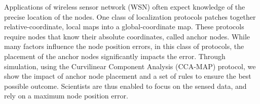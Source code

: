 Applications of wireless sensor network (WSN) often expect knowledge of the precise location of the nodes. One class of localization protocols patches together relative-coordinate, local maps into a global-coordinate map.  These protocols require nodes that know their absolute coordinates, called anchor nodes.  While many factors influence the node position errors, in this class of protocols, the placement of the anchor nodes significantly impacts the error.  Through simulation, using the Curvilinear Component Analysis (CCA-MAP) protocol, we show the impact of anchor node placement and a set of rules to ensure the best possible outcome.  Scientists are thus enabled to focus on the sensed data, and rely on a maximum node position error.
